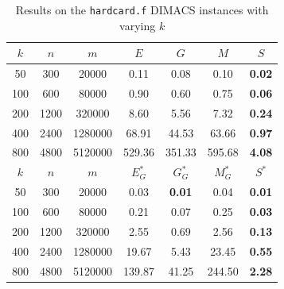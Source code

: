 \begin{table}
\centering
\begin{tabular}{
ccc|cccc}
$k$ & $n$ & $m$ & $E$ & $G$ & $M$ & $S$ \\
\hline
50 & 300 & 20000 & 0.11 & 0.08 & 0.10 & \textbf{0.02} \\
100 & 600 & 80000 & 0.90 & 0.60 & 0.75 & \textbf{0.06} \\
200 & 1200 & 320000 & 8.60 & 5.56 & 7.32 & \textbf{0.24} \\
400 & 2400 & 1280000 & 68.91 & 44.53 & 63.66 & \textbf{0.97} \\
800 & 4800 & 5120000 & 529.36 & 351.33 & 595.68 & \textbf{4.08} \\
\hline
$k$ & $n$ & $m$ & $E^*_G$ & $G^*_G$ & $M^*_G$ & $S^*$ \\
\hline
50 & 300 & 20000 & 0.03 & \textbf{0.01} & 0.04 & \textbf{0.01} \\
100 & 600 & 80000 & 0.21 & 0.07 & 0.25 & \textbf{0.03} \\
200 & 1200 & 320000 & 2.55 & 0.69 & 2.56 & \textbf{0.13} \\
400 & 2400 & 1280000 & 19.67 & 5.43 & 23.45 & \textbf{0.55} \\
800 & 4800 & 5120000 & 139.87 & 41.25 & 244.50 & \textbf{2.28} \\
\end{tabular}
\caption{Results on the \texttt{hardcard.f} DIMACS instances with varying $k$}\label{tab:hardcard}
\end{table}

